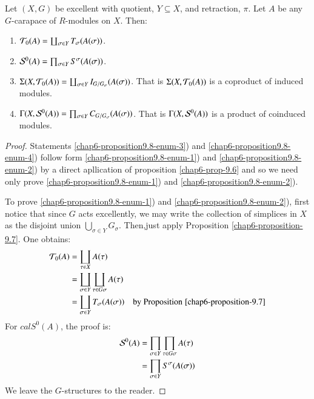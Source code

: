 \begin{secprop}\label{chap6-proposition-9.8}
Let $(X, G)$ be excellent with quotient, $Y \subseteq X$, and retraction, $\pi$. Let $A$ be any $G$-carapace of $R$-modules on $X$. Then:
\begin{enumerate}[(1)]
\item $\mathcal{T}_{0}(A)= \coprod_{\sigma \in Y}T_{\sigma}(A(\sigma))$.\label{chap6-proposition9.8-enum-1}
\item $\mathcal{S}^{0}(A) = \prod_{\sigma \in Y} S^{\sigma}(A(\sigma))$.\label{chap6-proposition9.8-enum-2}
\item $\Sigma(X, \mathcal{T}_{0}(A)) = \coprod_{\sigma \in Y} I_{G/G_{\sigma}}(A(\sigma))$. That is $\Sigma(X, \mathcal{T}_{0}(A))$ is a coproduct of induced modules.\label{chap6-proposition9.8-enum-3}
\item $\Gamma(X, \mathcal{S}^{0}(A))= \prod_{\sigma \in Y}C_{G/G_{\sigma}}(A(\sigma))$. That is $\Gamma(X, \mathcal{S}^{0}(A))$ is a product of coinduced modules. \label{chap6-proposition9.8-enum-4}
\end{enumerate}
\end{secprop}

\begin{proof}
Statements \ref{chap6-proposition9.8-enum-3}) and \ref{chap6-proposition9.8-enum-4}) follow form \ref{chap6-proposition9.8-enum-1}) and  \ref{chap6-proposition9.8-enum-2}) by a direct apllication of proposition \ref{chap6-prop-9.6} and so we need only prove \ref{chap6-proposition9.8-enum-1})  and \ref{chap6-proposition9.8-enum-2}).

To prove \ref{chap6-proposition9.8-enum-1}) and \ref{chap6-proposition9.8-enum-2}), first notice that since $G$ acts excellently, we may write the collection of simplices in $X$ as the disjoint union $\bigcup_{\sigma \in Y}G_{\sigma}$. Then,just apply Proposition \ref{chap6-proposition-9.7}. One obtains:
\begin{align*}
\mathcal{T}_{0}(A) &= \coprod_{\tau \in X}A(\tau)\\
& = \coprod_{\sigma \in Y} \coprod_{\tau \in G\sigma}A(\tau)\\
 & = \coprod_{\sigma \in Y} T_{\sigma}(A(\sigma)) \quad \text{by Proposition}\; \ref{chap6-proposition-9.7}
\end{align*}
For $calS^{0}(A)$, the proof is:
\begin{align*}
\mathcal{S}^{0}(A) &= \prod_{\sigma \in Y} \prod_{\tau \in G\sigma}A(\tau)\\
& = \prod_{\sigma \in Y}S^{\sigma}(A(\sigma))
\end{align*}
We leave the $G$-structures to the reader.
\end{proof}

